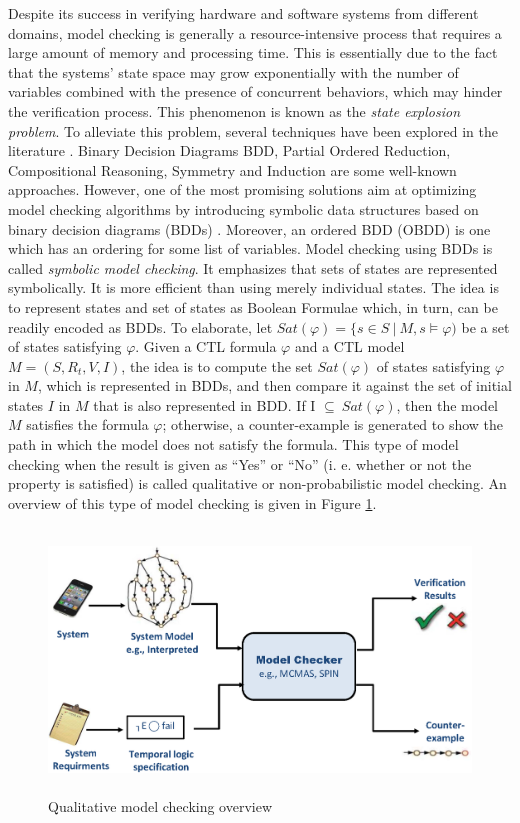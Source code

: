 Despite its success in verifying hardware and software systems from different domains, model checking is generally a resource-intensive process that requires a large amount of memory and processing time. This is essentially due to the fact that the systems' state space may grow exponentially with the number of variables combined with the presence of concurrent behaviors, which may hinder the verification process. This phenomenon is known as the \textit{state explosion problem}. To alleviate  this problem, several techniques have been explored in the literature \cite{Baier2008}. Binary Decision Diagrams BDD, Partial Ordered Reduction, Compositional Reasoning, Symmetry and Induction are some well-known approaches. However, one of the most promising solutions aim at optimizing model checking algorithms by introducing symbolic data structures based on binary decision diagrams (BDDs) \cite{Clarke1999,McMillan1992}. Moreover, an ordered BDD (OBDD) is one which has an ordering for some list of variables. Model checking using BDDs is called \textit{symbolic model checking}. It emphasizes that sets of states are represented symbolically. It is more efficient than using merely individual states. The idea is to represent states and set of states as Boolean Formulae which, in turn, can be readily encoded as BDDs. To elaborate, let $Sat(\varphi)= \{s \in S ~|~ M,s\models\varphi)$ be a set of states satisfying $\varphi$. Given a CTL formula $\varphi$ and a CTL model $M = (S,R_t, V, I)$, the idea is to compute the set $Sat(\varphi)$ of states satisfying $\varphi$ in $M$, which is represented in BDDs, and then compare it against the set of initial states $I$ in $M$ that is also represented in BDD. If I $\subseteq~ Sat(\varphi)$, then the model $M$ satisfies the formula $\varphi$; otherwise, a counter-example is generated to show the path in which the model does not satisfy the formula. This type of model checking when the result is given as ``Yes'' or ``No'' (i. e. whether or not the property is satisfied) is called qualitative or non-probabilistic model checking. An overview of this type of model checking is given in Figure \ref{fig:model-checking-cha2}.

\begin{figure}[t]
                \begin{center}
                \includegraphics[width=12cm, height=7cm]{chap2/img/modelchecking1.eps}
                \end{center}
                \caption{Qualitative model checking overview}
                \label{fig:model-checking-cha2}
                \end{figure}


